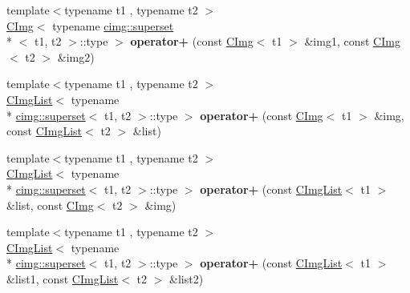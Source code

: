 \begin{DoxyCompactItemize}
\item 
\hypertarget{namespacecimg__library_a8b298dd701088637e648945442ef277e}{{\footnotesize template$<$typename t1 , typename t2 $>$ }\\\hyperlink{structcimg__library_1_1_c_img}{C\-Img}$<$ typename \hyperlink{structcimg__library_1_1cimg_1_1superset}{cimg\-::superset}\\*
$<$ t1, t2 $>$\-::type $>$ {\bfseries operator+} (const \hyperlink{structcimg__library_1_1_c_img}{C\-Img}$<$ t1 $>$ \&img1, const \hyperlink{structcimg__library_1_1_c_img}{C\-Img}$<$ t2 $>$ \&img2)}\label{namespacecimg__library_a8b298dd701088637e648945442ef277e}

\item 
\hypertarget{namespacecimg__library_a9f01b9c1a303b9e129d396b41c16986a}{{\footnotesize template$<$typename t1 , typename t2 $>$ }\\\hyperlink{structcimg__library_1_1_c_img_list}{C\-Img\-List}$<$ typename \\*
\hyperlink{structcimg__library_1_1cimg_1_1superset}{cimg\-::superset}$<$ t1, t2 $>$\-::type $>$ {\bfseries operator+} (const \hyperlink{structcimg__library_1_1_c_img}{C\-Img}$<$ t1 $>$ \&img, const \hyperlink{structcimg__library_1_1_c_img_list}{C\-Img\-List}$<$ t2 $>$ \&list)}\label{namespacecimg__library_a9f01b9c1a303b9e129d396b41c16986a}

\item 
\hypertarget{namespacecimg__library_afb8e494f04b2ac3dab57194fe2f35164}{{\footnotesize template$<$typename t1 , typename t2 $>$ }\\\hyperlink{structcimg__library_1_1_c_img_list}{C\-Img\-List}$<$ typename \\*
\hyperlink{structcimg__library_1_1cimg_1_1superset}{cimg\-::superset}$<$ t1, t2 $>$\-::type $>$ {\bfseries operator+} (const \hyperlink{structcimg__library_1_1_c_img_list}{C\-Img\-List}$<$ t1 $>$ \&list, const \hyperlink{structcimg__library_1_1_c_img}{C\-Img}$<$ t2 $>$ \&img)}\label{namespacecimg__library_afb8e494f04b2ac3dab57194fe2f35164}

\item 
\hypertarget{namespacecimg__library_aa5acfab2004d3e428bcd67d667a6b9b9}{{\footnotesize template$<$typename t1 , typename t2 $>$ }\\\hyperlink{structcimg__library_1_1_c_img_list}{C\-Img\-List}$<$ typename \\*
\hyperlink{structcimg__library_1_1cimg_1_1superset}{cimg\-::superset}$<$ t1, t2 $>$\-::type $>$ {\bfseries operator+} (const \hyperlink{structcimg__library_1_1_c_img_list}{C\-Img\-List}$<$ t1 $>$ \&list1, const \hyperlink{structcimg__library_1_1_c_img_list}{C\-Img\-List}$<$ t2 $>$ \&list2)}\label{namespacecimg__library_aa5acfab2004d3e428bcd67d667a6b9b9}


\end{DoxyCompactItemize}

